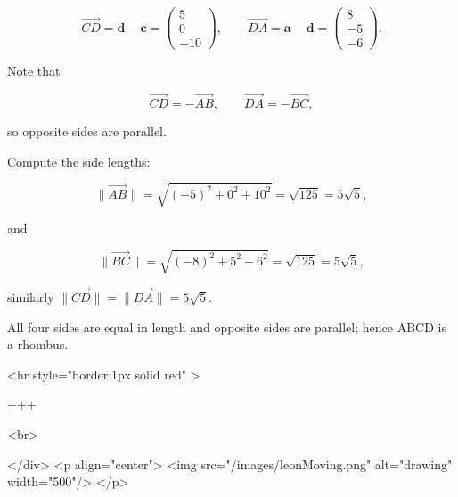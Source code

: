 $$
\overrightarrow{CD}=\mathbf{d}-\mathbf{c}=\left(\begin{array}{c}5\\0\\-10\end{array}\right),\qquad
\overrightarrow{DA}=\mathbf{a}-\mathbf{d}=\left(\begin{array}{c}8\\-5\\-6\end{array}\right).
$$

Note that

$$
\overrightarrow{CD}=-\overrightarrow{AB},\qquad \overrightarrow{DA}=-\overrightarrow{BC},
$$

so opposite sides are parallel.

Compute the side lengths:

$$
\lVert\overrightarrow{AB}\rVert=\sqrt{(-5)^2+0^2+10^2}=\sqrt{125}=5\sqrt{5},
$$

and

$$
\lVert\overrightarrow{BC}\rVert=\sqrt{(-8)^2+5^2+6^2}=\sqrt{125}=5\sqrt{5},
$$

similarly $\lVert\overrightarrow{CD}\rVert=\lVert\overrightarrow{DA}\rVert=5\sqrt{5}$.

All four sides are equal in length and opposite sides are parallel; hence ABCD is a rhombus.

<hr style="border:1px solid red" >

+++

<br>

</div>
<p align="center">
<img src="/images/leonMoving.png" alt="drawing" width="500"/>
</p>
